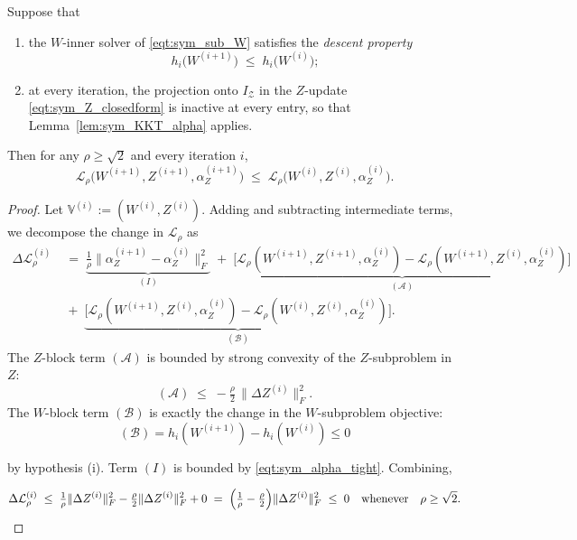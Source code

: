 \documentclass{article}
\begin{document}
\begin{theorem}
\label{thm:sym_decreasing_tight}
Suppose that
\begin{enumerate}
\item[(i)] the $W$-inner solver of \eqref{eqt:sym_sub_W} satisfies the \emph{descent property}
\begin{equation}
h_i\bigl(W^{(i+1)}\bigr) \;\leq\; h_i\bigl(W^{(i)}\bigr);
\label{eqt:descent_only}
\end{equation}
\item[(ii)] at every iteration, the projection onto $I_{\mathcal{Z}}$ in the $Z$-update \eqref{eqt:sym_Z_closedform} is inactive at every entry, so that Lemma~\ref{lem:sym_KKT_alpha} applies.
\end{enumerate}
Then for any $\rho \geq \sqrt{2}$ and every iteration $i$,
\begin{equation}
\mathcal{L}_{\rho}\!\bigl(W^{(i+1)},Z^{(i+1)},\alpha_Z^{(i+1)}\bigr)
\;\le\; \mathcal{L}_{\rho}\!\bigl(W^{(i)},Z^{(i)},\alpha_Z^{(i)}\bigr).
\label{eqt:sym_descent_thm}
\end{equation}
\end{theorem}
\begin{proof}
Let $\mathbb{V}^{(i)} := (W^{(i)}, Z^{(i)})$. Adding and subtracting intermediate terms, we decompose the change in $\mathcal{L}_\rho$ as
\begin{align*}
\Delta \mathcal{L}_\rho^{(i)}
&\;=\; \underbrace{\frac{1}{\rho}\|\alpha_Z^{(i+1)}-\alpha_Z^{(i)}\|_F^2}_{(I)}
\;+\; \underbrace{\bigl[\mathcal{L}_\rho(W^{(i+1)},Z^{(i+1)},\alpha_Z^{(i)}) - \mathcal{L}_\rho(W^{(i+1)},Z^{(i)},\alpha_Z^{(i)})\bigr]}_{(\mathcal{A})} \\
&\;+\; \underbrace{\bigl[\mathcal{L}_\rho(W^{(i+1)},Z^{(i)},\alpha_Z^{(i)}) - \mathcal{L}_\rho(W^{(i)},Z^{(i)},\alpha_Z^{(i)})\bigr]}_{(\mathcal{B})}.
\end{align*}
The $Z$-block term $(\mathcal{A})$ is bounded by strong convexity of the $Z$-subproblem in $Z$:
\begin{equation}
(\mathcal{A}) \;\leq\; -\tfrac{\rho}{2}\,\|\Delta Z^{(i)}\|_F^2.
\label{eqt:sym_A_bound}
\end{equation}
The $W$-block term $(\mathcal{B})$ is exactly the change in the $W$-subproblem objective: 
\[
(\mathcal{B}) = h_i(W^{(i+1)}) - h_i(W^{(i)}) \leq 0
\]

by hypothesis (i). Term $(I)$ is bounded by \eqref{eqt:sym_alpha_tight}. Combining,

\begin{align}
\Delta\mathcal{L}_\rho^{(i)}
\;\leq\; \tfrac{1}{\rho}\|\Delta Z^{(i)}\|_F^2 - \tfrac{\rho}{2}\|\Delta Z^{(i)}\|_F^2 + 0
\;=\; \Bigl(\tfrac{1}{\rho} - \tfrac{\rho}{2}\Bigr)\|\Delta Z^{(i)}\|_F^2
\;\leq\; 0
\quad\text{whenever}\quad \rho \geq \sqrt{2}.
\end{align}
\end{proof}
\end{document}
